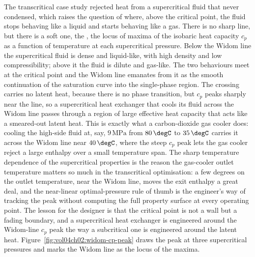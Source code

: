 \begin{mastery}
The transcritical case study rejected heat from a supercritical fluid that
never condensed, which raises the question of where, above the critical
point, the fluid stops behaving like a liquid and starts behaving like a
gas. There is no sharp line, but there is a soft one, the , the locus of maxima of the isobaric heat capacity $c_p$ as a function
of temperature at each supercritical pressure. Below the Widom line the
supercritical fluid is dense and liquid-like, with high density and low
compressibility; above it the fluid is dilute and gas-like. The two
behaviours meet at the critical point and the Widom line emanates from it as
the smooth continuation of the saturation curve into the single-phase
region. The crossing carries no latent heat, because there is no phase
transition, but $c_p$ peaks sharply near the line, so a supercritical heat
exchanger that cools its fluid across the Widom line passes through a region
of large effective heat capacity that acts like a smeared-out latent heat.
This is exactly what a carbon-dioxide gas cooler does: cooling the
high-side fluid at, say, $9\,\text{MPa}$ from $80\,\degC$ to $35\,\degC$
carries it across the Widom line near $40\,\degC$, where the steep $c_p$
peak lets the gas cooler reject a large enthalpy over a small temperature
span. The sharp temperature dependence of the supercritical properties is
the reason the gas-cooler outlet temperature matters so much in the
transcritical optimisation: a few degrees on the outlet temperature, near
the Widom line, moves the exit enthalpy a great deal, and the
near-linear optimal-pressure rule of thumb is the engineer's way of tracking
the peak without computing the full property surface at every operating
point. The lesson for the designer is that the critical point is not a wall
but a fading boundary, and a supercritical heat exchanger is engineered
around the Widom-line $c_p$ peak the way a subcritical one is engineered
around the latent heat. Figure~\ref{fig:vol04ch02:widom-cp-peak} draws the
peak at three supercritical pressures and marks the Widom line as the locus
of the maxima.
\end{mastery}



